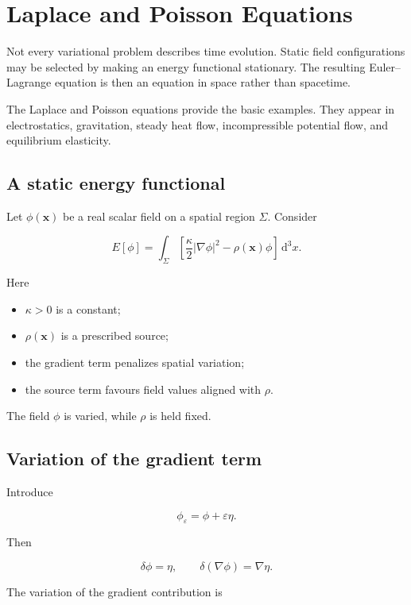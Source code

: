 \section{Laplace and Poisson Equations}
\label{sec:laplace_and_poisson_equations}

Not every variational problem describes time evolution. Static field configurations may be selected by making an energy functional stationary. The resulting Euler--Lagrange equation is then an equation in space rather than spacetime.

The Laplace and Poisson equations provide the basic examples. They appear in electrostatics, gravitation, steady heat flow, incompressible potential flow, and equilibrium elasticity.

\subsection{A static energy functional}

Let \(\phi(\mathbf{x})\) be a real scalar field on a spatial region \(\Sigma\). Consider

\[
\boxed{
E[\phi]
=
\int_{\Sigma}
\left[
\frac{\kappa}{2}|\nabla\phi|^{2}
-
\rho(\mathbf{x})\phi
\right]
\,\mathrm{d}^{3}x
}.
\]

Here

\begin{itemize}
    \item \(\kappa>0\) is a constant;
    \item \(\rho(\mathbf{x})\) is a prescribed source;
    \item the gradient term penalizes spatial variation;
    \item the source term favours field values aligned with \(\rho\).
\end{itemize}

The field \(\phi\) is varied, while \(\rho\) is held fixed.

\subsection{Variation of the gradient term}

Introduce

\[
\phi_{\varepsilon}
=
\phi+\varepsilon\eta.
\]

Then

\[
\delta\phi=\eta,
\qquad
\delta(\nabla\phi)=\nabla\eta.
\]

The variation of the gradient contribution is


